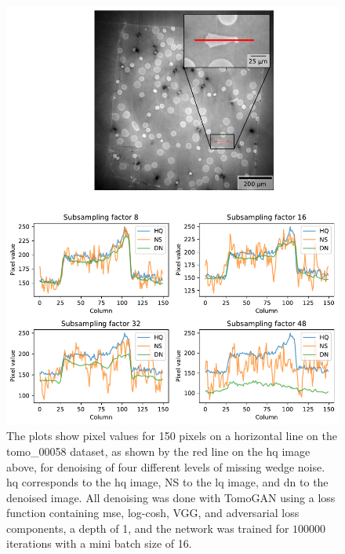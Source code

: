 \begin{figure}[htbp]
  \centering
  \includegraphics[width=.95\textwidth]{figures/differentnoiselineplot1.pdf}
  \caption[Pixel value plot of denoising of different levels of noise on tomo\_00058]{The plots show pixel values for 150 pixels on a horizontal line on the tomo\_00058 dataset, as shown by the red line on the \gls{hq} image above, for denoising of four different levels of missing wedge noise. \gls{hq} corresponds to the \gls{hq} image, NS to the \gls{lq} image, and \gls{dn} to the denoised image. All denoising was done with TomoGAN using a loss function containing \gls{mse}, log-cosh, VGG, and adversarial loss components, a depth of 1, and the network was trained for $100 000$ iterations with a mini batch size of 16. }
  \label{fig:differentnoiselineplot1}
\end{figure}

